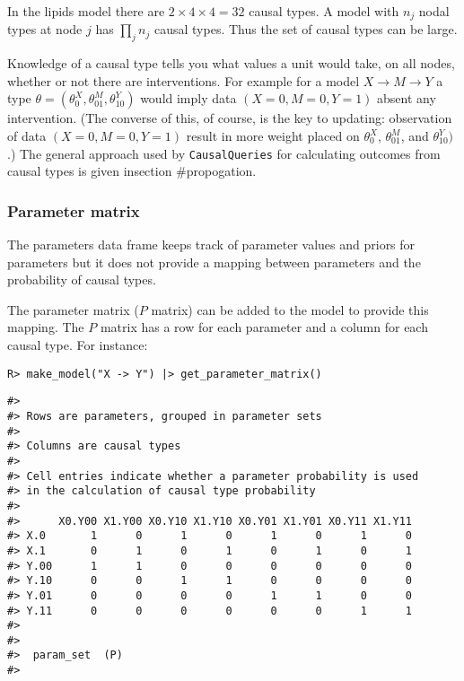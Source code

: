 \documentclass[
  11pt,
  article]{jss}
\begin{document}
In the lipids model there are \(2\times 4\times 4 = 32\) causal types. A
model with \(n_j\) nodal types at node \(j\) has \(\prod_jn_j\) causal
types. Thus the set of causal types can be large.

Knowledge of a causal type tells you what values a unit would take, on
all nodes, whether or not there are interventions. For example for a
model \(X \rightarrow M \rightarrow Y\) a type
\(\theta = (\theta^X_0, \theta^M_{01}, \theta^Y_{10})\) would imply data
\((X=0, M=0, Y=1)\) absent any intervention. (The converse of this, of
course, is the key to updating: observation of data \((X=0, M=0, Y=1)\)
result in more weight placed on \(\theta^X_0\), \(\theta^M_{01}\), and
\(\theta^Y_{10})\).) The general approach used by \texttt{CausalQueries}
for calculating outcomes from causal types is given insection
\#propogation.

\hypertarget{parameter-matrix}{%
\subsubsection{Parameter matrix}\label{parameter-matrix}}

The parameters data frame keeps track of parameter values and priors for
parameters but it does not provide a mapping between parameters and the
probability of causal types.

The parameter matrix (\(P\) matrix) can be added to the model to provide
this mapping. The \(P\) matrix has a row for each parameter and a column
for each causal type. For instance:

\begin{verbatim}
R> make_model("X -> Y") |> get_parameter_matrix()
\end{verbatim}

\begin{verbatim}
#> 
#> Rows are parameters, grouped in parameter sets
#> 
#> Columns are causal types
#> 
#> Cell entries indicate whether a parameter probability is used
#> in the calculation of causal type probability
#> 
#>      X0.Y00 X1.Y00 X0.Y10 X1.Y10 X0.Y01 X1.Y01 X0.Y11 X1.Y11
#> X.0       1      0      1      0      1      0      1      0
#> X.1       0      1      0      1      0      1      0      1
#> Y.00      1      1      0      0      0      0      0      0
#> Y.10      0      0      1      1      0      0      0      0
#> Y.01      0      0      0      0      1      1      0      0
#> Y.11      0      0      0      0      0      0      1      1
#> 
#>  
#>  param_set  (P)
#> 
\end{verbatim}
\end{document}
